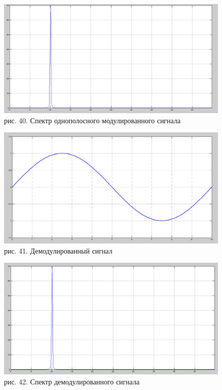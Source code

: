 \documentclass[10pt,a4paper]{report}
\begin{document}
\begin{figure}
\begin{center}
\includegraphics[width=150mm, scale = 0.9]{7_12.png}\newline
рис. 40. Спектр однополосного модулированного сигнала\newline
\end{center}
\end{figure}
\begin{figure}
\begin{center}
\includegraphics[width=150mm, scale = 0.9]{7_13.png}\newline
рис. 41. Демодулированный сигнал\newline
\end{center}
\end{figure}
\begin{figure}
\begin{center}
\includegraphics[width=150mm, scale = 0.9]{7_14.png}\newline
рис. 42. Спектр демодулированного сигнала\newline
\end{center}
\end{figure}
\end{document}

